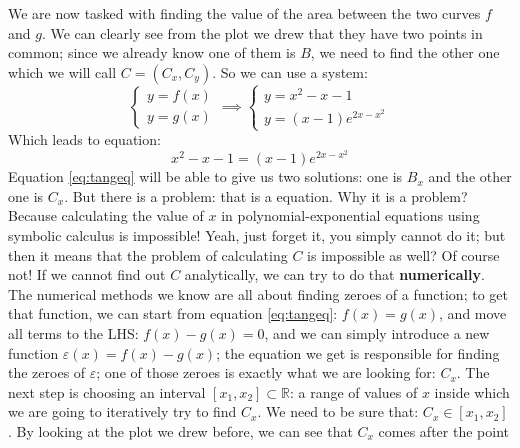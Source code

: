 We are now tasked with finding the value of the area between the two curves $f$ and $g$.
We can clearly see from the plot we drew that they have two points in common;
since we already know one of them
is $B$, we need to find the other one which we will call $C = (C_x, C_y)$.
So we can use a system:
\begin{equation*}
    \begin{cases}
        y = f(x)\\
        y = g(x)
    \end{cases}
    \implies
    \begin{cases}
        y = x^2 - x - 1\\
        y = (x - 1)e^{2x - x^2}
    \end{cases}
\end{equation*}
Which leads to equation:
\begin{equation}\label{eq:tangeq}
    x^2 - x - 1 = (x - 1)e^{2x - x^2}
\end{equation}
Equation \ref{eq:tangeq} will be able to give us two solutions: one is $B_x$ and
the other one is $C_x$. But there is a problem: that is a
 equation. Why it
is a problem? Because calculating the value of $x$ in
polynomial-exponential equations using symbolic calculus is
impossible!
Yeah, just forget it, you simply cannot do it; but then it means that the problem
of calculating $C$ is impossible as well? Of course not! If we cannot
find out $C$ analytically, we can try to do that \textbf{numerically}.
The numerical methods we know are all about finding zeroes of a function;
to get that function, we can start from equation \ref{eq:tangeq}: $f(x) = g(x)$,
and move all terms to the LHS: $f(x) - g(x) = 0$, and we can simply
introduce a new function $\varepsilon(x) = f(x) - g(x)$; the equation we get
is responsible for finding the zeroes of $\varepsilon$; one of those zeroes is
exactly what we are looking for: $C_x$.
The next step is choosing an interval $[x_1, x_2] \subset \mathbb{R}$: a range
of values of $x$ inside which we are going to iteratively try to find $C_x$.
We need to be sure that: $C_x \in [x_1, x_2]$.
By looking at the plot we drew before, we can see that $C_x$ comes after the point
